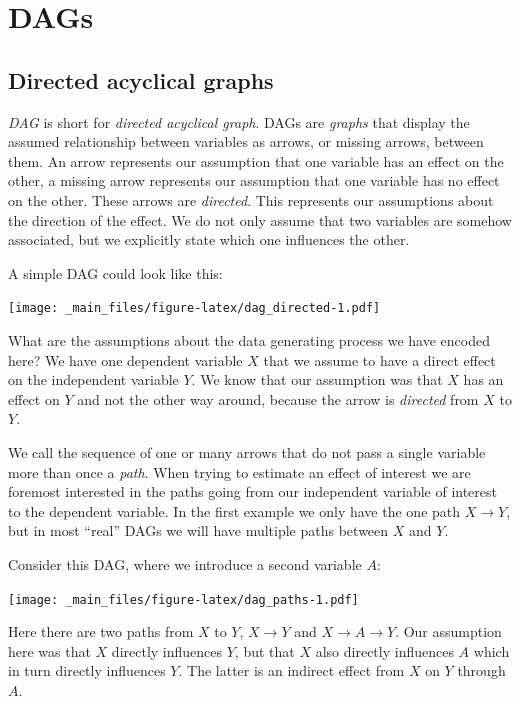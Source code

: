 \documentclass[
]{book}
\begin{document}
\hypertarget{dags}{%
\section{DAGs}\label{dags}}

\hypertarget{directed-acyclical-graphs}{%
\subsection{Directed acyclical graphs}\label{directed-acyclical-graphs}}

\emph{DAG} is short for \emph{directed acyclical graph}. DAGs are \emph{graphs} that
display the assumed relationship between variables as arrows, or missing
arrows, between them. An arrow represents our assumption that one
variable has an effect on the other, a missing arrow represents our
assumption that one variable has no effect on the other. These arrows
are \emph{directed}. This represents our assumptions about the direction of
the effect. We do not only assume that two variables are somehow
associated, but we explicitly state which one influences the other.

A simple DAG could look like this:

\texttt{[image: \_main\_files/figure-latex/dag\_directed-1.pdf]}

What are the assumptions about the data generating process we have
encoded here? We have one dependent variable \(X\) that we assume to have
a direct effect on the independent variable \(Y\). We know that our
assumption was that \(X\) has an effect on \(Y\) and not the other way
around, because the arrow is \emph{directed} from \(X\) to \(Y\).

We call the sequence of one or many arrows that do not pass a single
variable more than once a \emph{path}. When trying to estimate an effect of
interest we are foremost interested in the paths going from our
independent variable of interest to the dependent variable. In the first
example we only have the one path \(X \rightarrow Y\), but in most ``real''
DAGs we will have multiple paths between \(X\) and \(Y\).

Consider this DAG, where we introduce a second variable \(A\):

\texttt{[image: \_main\_files/figure-latex/dag\_paths-1.pdf]}

Here there are two paths from \(X\) to \(Y\), \(X \rightarrow Y\) and
\(X \rightarrow A \rightarrow Y\). Our assumption here was that \(X\)
directly influences \(Y\), but that \(X\) also directly influences \(A\) which
in turn directly influences \(Y\). The latter is an indirect effect from
\(X\) on \(Y\) through \(A\).
\end{document}

